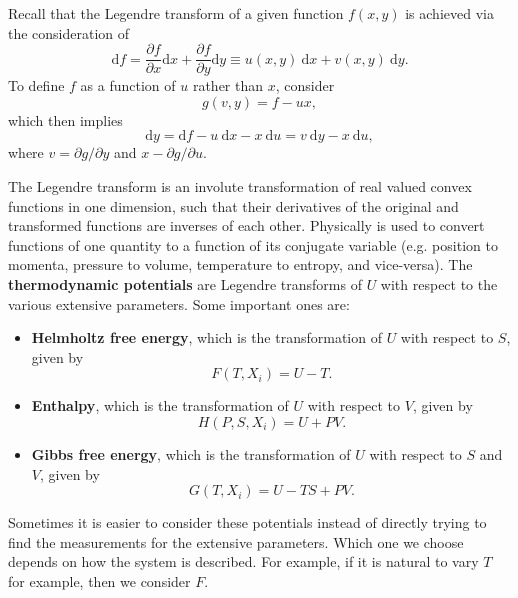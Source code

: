 \documentclass[letter-paper]{tufte-book}
\newcommand\Def[1]{\textbf{#1}}
\begin{document}
Recall that the Legendre transform of a given function $f(x,y)$ is achieved via
the consideration of
\begin{equation*}
  \mathrm{d}f = \frac{\partial f}{\partial x}\mathrm{d}x + \frac{\partial f}{\partial y}\mathrm{d}y \equiv u(x,y)\ \mathrm{d}x + v(x,y)\ \mathrm{d}y.
\end{equation*}
To define $f$ as a function of $u$ rather than $x$, consider
\begin{equation*}
  g(v,y) = f - ux,
\end{equation*}
which then implies
\begin{equation*}
  \mathrm{d}y = \mathrm{d}f - u\ \mathrm{d}x - x\ \mathrm{d}u = v\ \mathrm{d}y - x\ \mathrm{d}u,
\end{equation*}
where $v = \partial g / \partial y$ and $x - \partial g / \partial u$.

The Legendre transform is an involute transformation of real valued convex
functions in one dimension, such that their derivatives of the original and
transformed functions are inverses of each other. Physically is used to convert
functions of one quantity to a function of its conjugate variable (e.g. position
to momenta, pressure to volume, temperature to entropy, and vice-versa). The
\Def{thermodynamic potentials} are Legendre transforms of $U$ with respect to
the various extensive parameters. Some important ones are:
\begin{itemize}
  \item \textbf{Helmholtz free energy}, which is the transformation of $U$
  with respect to $S$, given by
  \begin{equation}
    F(T, X_i) = U - T.
  \end{equation}
  
  \item \textbf{Enthalpy}, which is the transformation of $U$
  with respect to $V$, given by
  \begin{equation}
    H(P, S, X_i) = U + PV.
  \end{equation}
  
  \item \textbf{Gibbs free energy}, which is the transformation of $U$
  with respect to $S$ and $V$, given by
  \begin{equation}
    G(T, X_i) = U - TS + PV.
  \end{equation}
\end{itemize}
 Sometimes it is easier to consider these potentials
instead of directly trying to find the measurements for the extensive
parameters. Which one we choose depends on how the system is described. For
example, if it is natural to vary $T$ for example, then we consider $F$.
\end{document}
